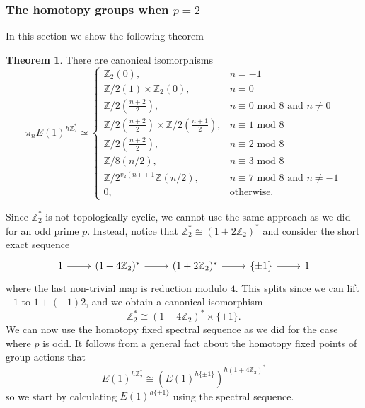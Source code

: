\documentclass[a4paper]{article} %
\theoremstyle{definition}
\newtheorem{theorem}{Theorem} %
\newcommand{\Z}{\mathbb{Z}}
\begin{document}
\subsubsection{The homotopy groups when $p=2$}

In this section we show the following theorem

\begin{theorem}\label{theorem:p=2final}
  There are canonical isomorphisms
  \[
  \pi_nE(1)^{h\Z_2^*} \simeq
    \begin{cases}
      \Z_2 (0), & n = -1 \\
      \Z/2  (1) \times \Z_2 (0), & n = 0 \\
      \Z / 2(\frac{n+2}{2}), & n \equiv 0 \text{ mod } 8 \text{ and } n \neq 0 \\
      \Z / 2 (\frac{n+2}{2}) \times \Z / 2 ( \frac{n+1}{2}), & n \equiv 1 \text{ mod } 8 \\
      \Z / 2 (\frac{n+2}{2}), & n \equiv 2 \text{ mod } 8 \\
      \Z / 8 (n/2), & n \equiv 3 \text{ mod } 8 \\
      \Z / 2^{v_2(n) + 1}\Z (n/2), & n \equiv 7 \text{ mod } 8 \text{ and } n \neq -1 \\
      0, & \text{otherwise.}
    \end{cases}
  \]
\end{theorem}
Since $\Z_2^*$ is not topologically cyclic, we cannot use the same approach as we did for an odd prime $p$. Instead, notice that $\Z_2^* \cong (1 + 2\Z_2)^*$ and consider the short exact sequence
\[
\begin{tikzcd}
  1 \arrow{r} & (1 + 4\Z_2)^* \arrow{r} & (1+2\Z_2)^* \arrow{r} & \{\pm 1\} \rar & 1
\end{tikzcd}
\]
where the last non-trivial map is reduction modulo $4$. This splits since we can lift $-1$ to $1 + (-1)2$, and we obtain a canonical isomorphism
\[
\Z_2^* \cong (1 + 4\Z_2)^* \times \{\pm 1\}.
\]
We can now use the homotopy fixed spectral sequence as we did for the case where $p$ is odd. It follows from a general fact about the homotopy fixed points of group actions that
\[
E(1)^{h\Z_2^*} \cong \left(E(1)^{h\{\pm 1\}}\right)^{h(1 + 4\Z_2)^*}
\]
so we start by calculating $E(1)^{h\{\pm 1\}}$ using the spectral sequence.
\end{document}
